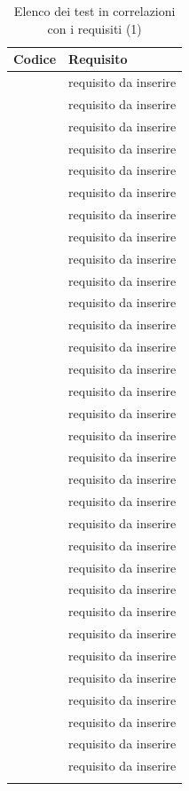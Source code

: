 	\begin{table}[H]
		\centering
		{\def\arraystretch{1.4}
		\begin{tabularx}{\textwidth}{YY}
			\textbf{Codice} & \textbf{Requisito} \\
			\toprule
			\addtots & requisito da inserire \\
			\addtots & requisito da inserire \\
			\addtots & requisito da inserire \\
			\addtots & requisito da inserire \\
			\addtots & requisito da inserire \\
			\addtots & requisito da inserire \\
			\addtots & requisito da inserire \\
			\addtots & requisito da inserire \\
			\addtots & requisito da inserire \\
			\addtots & requisito da inserire \\
			\addtots & requisito da inserire \\
			\addtots & requisito da inserire \\
			\addtots & requisito da inserire \\
			\addtots & requisito da inserire \\
			\addtots & requisito da inserire \\
			\addtots & requisito da inserire \\
			\addtots & requisito da inserire \\
			\addtots & requisito da inserire \\
			\addtots & requisito da inserire \\
			\addtots & requisito da inserire \\
			\addtots & requisito da inserire \\
			\addtots & requisito da inserire \\
			\addtots & requisito da inserire \\
			\addtots & requisito da inserire \\
			\addtots & requisito da inserire \\
			\addtots & requisito da inserire \\
			\addtots & requisito da inserire \\
			\addtots & requisito da inserire \\
			\addtots & requisito da inserire \\
			\addtots & requisito da inserire \\
			\addtots & requisito da inserire \\
			\addtots & requisito da inserire \\
            \bottomrule\\
			\end{tabularx}}
		\caption{Elenco dei test in correlazioni con i requisiti (1)}
	\end{table}
    

